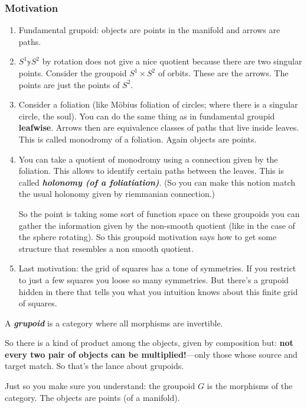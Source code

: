 \subsubsection{Motivation}
\begin{enumerate}
\item Fundamental grupoid: objects are points in the manifold and arrows are paths.
\item \(S^1 \mathbb{y} S^2\) by rotation does not give a nice quotient because there are two singular points. Consider the groupoid  \(S^1 \times S^2\) of orbits. These are the arrows. The points are just the points of \(S^2\).
\item Consider a foliation (like Möbius foliation of circles; where there is a singular circle, the soul). You can do the same thing as in fundamental groupid \textbf{leafwise}. Arrows then are equivalence classes of paths that live inside leaves. This is called monodromy of a foliation. Again objects are points.
\item You can take a quotient of monodromy using a connection given by the foliation. This allows to identify certain paths between the leaves. This is called \textit{\textbf{holonomy (of a foliatiation)}}. (So you can make this notion match the usual holonomy given by riemmanian connection.)
	\begin{upshot}\leavevmode
	So the point is taking some sort of function space on these groupoids you can gather the information given by the non-smooth quotient (like in the case of the sphere rotating). So this groupoid motivation says how to get some structure that resembles a non smooth quotient.
	\end{upshot}
\item Last motivation: the grid of squares has a tone of symmetries. If you restrict to just a few squares you loose so many symmetries. But there's a grupoid hidden in there that tells you what you intuition knows about this finite grid of squares.
\end{enumerate}

\begin{defn}\leavevmode
A \textit{\textbf{grupoid}} is a category where all morphisms are invertible.
\end{defn}

So there is a kind of product among the objects, given by composition but: \textbf{not every two pair of objects can be multiplied!}---only those whose source and target match. So that's the lance about grupoids.

Just so you make sure you understand: the groupoid \(G\) is the morphisms of the category. The objects are points (of a manifold).

